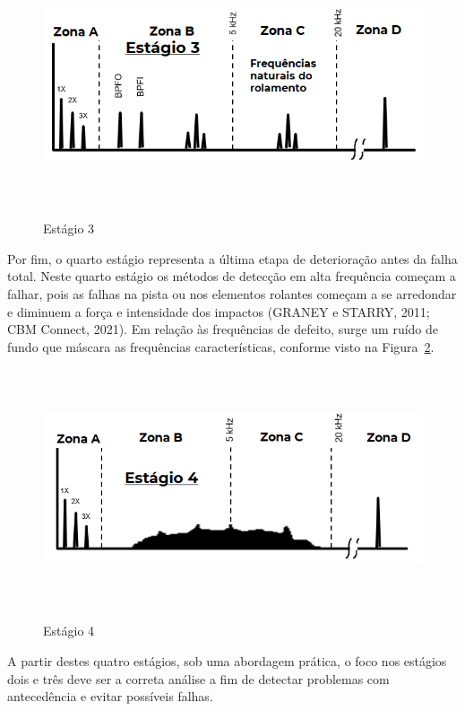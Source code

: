 \documentclass[
	12pt,				
	oneside,			
	a4paper,			
	english,			
	brazil,			
	]{abntex2ppgsi}
\begin{document}
\begin{figure}[H]
\centering
\caption {Estágio 3}
\includegraphics[width=\textwidth,height=70mm,keepaspectratio]{estagio_3}
\label{estagio_3}
\end{figure}

Por fim, o quarto estágio representa a última etapa de deterioração antes da falha total. Neste quarto estágio os métodos de detecção em alta frequência começam a falhar, pois as falhas na pista ou nos elementos rolantes começam a se arredondar e diminuem a força e intensidade dos impactos (GRANEY e STARRY, 2011; CBM Connect, 2021). Em relação às frequências de defeito, surge um ruído de fundo que máscara as frequências características, conforme visto na Figura~\ref{estagio_4}.

\begin{figure}[H]
\centering
\caption {Estágio 4}
\includegraphics[width=\textwidth,height=70mm,keepaspectratio]{estagio_4}
\label{estagio_4}
\end{figure}

A partir destes quatro estágios, sob uma abordagem prática, o foco nos estágios dois e três deve ser a correta análise a fim de detectar problemas com antecedência e evitar possíveis falhas. 
\end{document}
